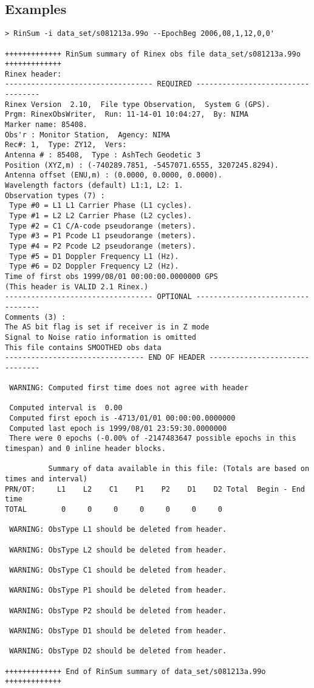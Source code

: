 \subsection{Examples}
\begin{\outputsize}
\begin{lstlisting}
> RinSum -i data_set/s081213a.99o --EpochBeg 2006,08,1,12,0,0'

+++++++++++++ RinSum summary of Rinex obs file data_set/s081213a.99o +++++++++++++
Rinex header:
---------------------------------- REQUIRED ----------------------------------
Rinex Version  2.10,  File type Observation,  System G (GPS).
Prgm: RinexObsWriter,  Run: 11-14-01 10:04:27,  By: NIMA
Marker name: 85408.
Obs'r : Monitor Station,  Agency: NIMA
Rec#: 1,  Type: ZY12,  Vers:
Antenna # : 85408,  Type : AshTech Geodetic 3
Position (XYZ,m) : (-740289.7851, -5457071.6555, 3207245.8294).
Antenna offset (ENU,m) : (0.0000, 0.0000, 0.0000).
Wavelength factors (default) L1:1, L2: 1.
Observation types (7) :
 Type #0 = L1 L1 Carrier Phase (L1 cycles).
 Type #1 = L2 L2 Carrier Phase (L2 cycles).
 Type #2 = C1 C/A-code pseudorange (meters).
 Type #3 = P1 Pcode L1 pseudorange (meters).
 Type #4 = P2 Pcode L2 pseudorange (meters).
 Type #5 = D1 Doppler Frequency L1 (Hz).
 Type #6 = D2 Doppler Frequency L2 (Hz).
Time of first obs 1999/08/01 00:00:00.0000000 GPS
(This header is VALID 2.1 Rinex.)
---------------------------------- OPTIONAL ----------------------------------
Comments (3) :
The AS bit flag is set if receiver is in Z mode
Signal to Noise ratio information is omitted
This file contains SMOOTHED obs data
-------------------------------- END OF HEADER -------------------------------

 WARNING: Computed first time does not agree with header

 Computed interval is  0.00
 Computed first epoch is -4713/01/01 00:00:00.0000000
 Computed last epoch is 1999/08/01 23:59:30.0000000
 There were 0 epochs (-0.00% of -2147483647 possible epochs in this timespan) and 0 inline header blocks.

          Summary of data available in this file: (Totals are based on times and interval)
PRN/OT:     L1    L2    C1    P1    P2    D1    D2 Total  Begin - End time
TOTAL        0     0     0     0     0     0     0

 WARNING: ObsType L1 should be deleted from header.

 WARNING: ObsType L2 should be deleted from header.

 WARNING: ObsType C1 should be deleted from header.

 WARNING: ObsType P1 should be deleted from header.

 WARNING: ObsType P2 should be deleted from header.

 WARNING: ObsType D1 should be deleted from header.

 WARNING: ObsType D2 should be deleted from header.

+++++++++++++ End of RinSum summary of data_set/s081213a.99o +++++++++++++
\end{lstlisting}
\end{\outputsize}

%

